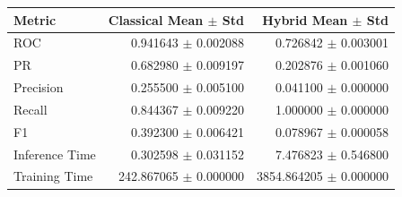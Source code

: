 \begin{table}[ht]
\centering
\begin{tabular}{lrr}
\toprule
Metric & Classical Mean $\pm$ Std & Hybrid Mean $\pm$ Std \\
\midrule
ROC & 0.941643 $\pm$ 0.002088 & 0.726842 $\pm$ 0.003001 \\
PR & 0.682980 $\pm$ 0.009197 & 0.202876 $\pm$ 0.001060 \\
Precision & 0.255500 $\pm$ 0.005100 & 0.041100 $\pm$ 0.000000 \\
Recall & 0.844367 $\pm$ 0.009220 & 1.000000 $\pm$ 0.000000 \\
F1 & 0.392300 $\pm$ 0.006421 & 0.078967 $\pm$ 0.000058 \\
Inference Time & 0.302598 $\pm$ 0.031152 & 7.476823 $\pm$ 0.546800 \\
Training Time & 242.867065 $\pm$ 0.000000 & 3854.864205 $\pm$ 0.000000 \\
\bottomrule
\end{tabular}
\end{table}
